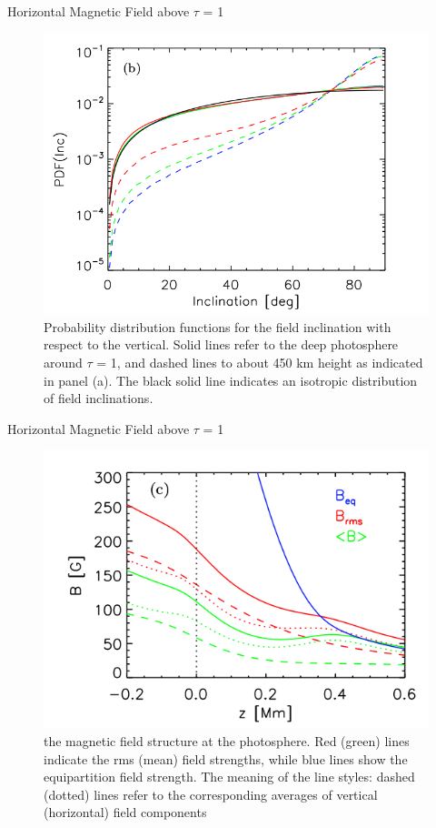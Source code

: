 \documentclass{beamer}
\begin{document}
\begin{frame}{Horizontal Magnetic Field above $\tau$ = 1 }

\begin{figure}[H]
 \centering
 \includegraphics[scale=0.3]{img382.png}
	\caption{ Probability distribution functions for the field inclination with respect to the vertical. Solid lines refer to
the deep photosphere around $\tau$ = 1, and dashed lines to about 450 km height as indicated in panel (a). The black solid line indicates an isotropic distribution of field
inclinations.}
\end{figure}

\end{frame}

\begin{frame}{Horizontal Magnetic Field above $\tau$ = 1 }

\begin{figure}[H]
 \centering
 \includegraphics[scale=0.3]{img383.png}
	\caption{the magnetic field structure at the photosphere. Red (green) lines indicate
the rms (mean) field strengths, while blue lines show the equipartition field strength. The meaning of the line styles: dashed
(dotted) lines refer to the corresponding averages of vertical (horizontal) field components}
\end{figure}

\end{frame}
\end{document}
